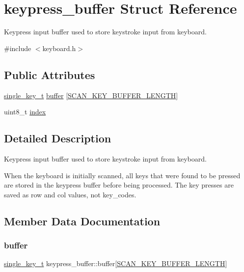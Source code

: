 \hypertarget{structkeypress__buffer}{}\section{keypress\+\_\+buffer Struct Reference}
\label{structkeypress__buffer}


Keypress input buffer used to store keystroke input from keyboard.  




{\ttfamily \#include $<$keyboard.\+h$>$}

\subsection*{Public Attributes}
\begin{DoxyCompactItemize}
\item 
\hyperlink{keyboard_8h_aa504c5d09bf7cea600b72b6003a8772c}{single\+\_\+key\+\_\+t} \hyperlink{structkeypress__buffer_a0d8585162eb9fe3f4e73753553e20bac}{buffer} \mbox{[}\hyperlink{keyboard_8h_ac2b728463ae48d3aa61340a61be68225}{S\+C\+A\+N\+\_\+\+K\+E\+Y\+\_\+\+B\+U\+F\+F\+E\+R\+\_\+\+L\+E\+N\+G\+TH}\mbox{]}
\item 
uint8\+\_\+t \hyperlink{structkeypress__buffer_aa65a87852d890d7f8068122b36205e2d}{index}
\end{DoxyCompactItemize}


\subsection{Detailed Description}
Keypress input buffer used to store keystroke input from keyboard. 

When the keyboard is initially scanned, all keys that were found to be pressed are stored in the keypress buffer before being processed. The key presses are saved as row and col values, not key\+\_\+codes. 

\subsection{Member Data Documentation}
\mbox{\label{structkeypress__buffer_a0d8585162eb9fe3f4e73753553e20bac}} 
\subsubsection{\texorpdfstring{buffer}{buffer}}
{\footnotesize\ttfamily \hyperlink{keyboard_8h_aa504c5d09bf7cea600b72b6003a8772c}{single\+\_\+key\+\_\+t} keypress\+\_\+buffer\+::buffer\mbox{[}\hyperlink{keyboard_8h_ac2b728463ae48d3aa61340a61be68225}{S\+C\+A\+N\+\_\+\+K\+E\+Y\+\_\+\+B\+U\+F\+F\+E\+R\+\_\+\+L\+E\+N\+G\+TH}\mbox{]}}

